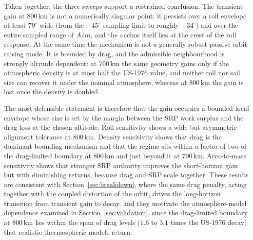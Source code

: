 \noindent Taken together, the three sweeps support a restrained conclusion. The transient gain at \(800\,\mathrm{km}\) is not a numerically singular point: it persists over a roll envelope at least \(79^\circ\) wide (from the \(-45^\circ\) sampling limit to roughly \(+34^\circ\)) and over the entire sampled range of \(A/m\), and the anchor itself lies at the crest of the roll response. At the same time the mechanism is not a generally robust passive orbit-raising mode. It is bounded by drag, and the admissible neighbourhood is strongly altitude dependent: at \(700\,\mathrm{km}\) the same geometry gains only if the atmospheric density is at most half the US-1976 value, and neither roll nor sail size can recover it under the nominal atmosphere, whereas at \(800\,\mathrm{km}\) the gain is lost once the density is doubled.
\vspace{5pt}
\par\noindent The most defensible statement is therefore that the gain occupies a bounded local envelope whose size is set by the margin between the SRP work surplus and the drag loss at the chosen altitude. Roll sensitivity shows a wide but asymmetric alignment tolerance at \(800\,\mathrm{km}\). Density sensitivity shows that drag is the dominant bounding mechanism and that the regime sits within a factor of two of the drag-limited boundary at \(800\,\mathrm{km}\) and just beyond it at \(700\,\mathrm{km}\). Area-to-mass sensitivity shows that stronger SRP authority improves the short-horizon gain but with diminishing returns, because drag and SRP scale together. These results are consistent with Section~\ref{sec:breakdown}, where the same drag penalty, acting together with the coupled distortion of the orbit, drives the long-horizon transition from transient gain to decay, and they motivate the atmosphere-model dependence examined in Section~\ref{sec:validation}, since the drag-limited boundary at \(800\,\mathrm{km}\) lies within the span of drag levels (\(1.6\) to \(3.1\) times the US-1976 decay) that realistic thermospheric models return.

\FloatBarrier
